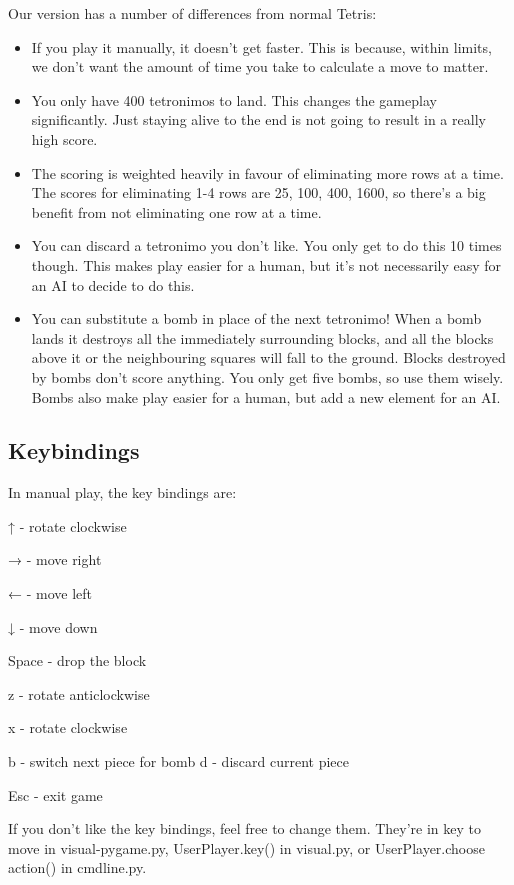 \documentclass{article}
\begin{document}
Our version has a number of differences from normal Tetris:
\begin{itemize}
\item If you play it manually, it doesn’t get faster. This is because, within limits, we don’t want the amount of time you take to calculate a move to matter.
\item You only have 400 tetronimos to land. This changes the gameplay significantly. Just staying alive to the end is not going to result in a really high score.
\item The scoring is weighted heavily in favour of eliminating more rows at a time. The scores for eliminating 1-4 rows are 25, 100, 400, 1600, so there’s a big benefit from not eliminating one row at a time.
\item You can discard a tetronimo you don’t like. You only get to do this 10 times though. This makes play easier for a human, but it’s not necessarily easy for an AI to decide to do this.
\item You can substitute a bomb in place of the next tetronimo! When a bomb lands it destroys all the immediately surrounding blocks, and all the blocks above it or the neighbouring squares will fall to the ground. Blocks destroyed by bombs don’t score anything. You only get five bombs, so use them wisely. Bombs also make play easier for a human, but add a new element for an AI.
\end{itemize}
\subsection*{Keybindings}

In manual play, the key bindings are:
\begin{description}
\item{↑} - rotate clockwise
\item{→} - move right
\item{←} - move left
\item{↓} - move down
\item{Space} - drop the block
\item{z} - rotate anticlockwise
\item{x} - rotate clockwise
\item{b} - switch next piece for bomb d - discard current piece
\item{Esc} - exit game
\end{description}
If you don’t like the key bindings, feel free to change them. They’re
in key to move in visual-pygame.py, UserPlayer.key() in visual.py, or
UserPlayer.choose action() in cmdline.py.
\end{document}
